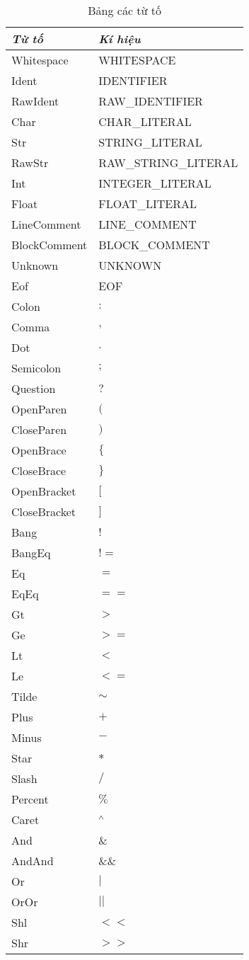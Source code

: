 \begin{longtable}{|p{4cm}| l |}
    \caption{Bảng các từ tố} \\
\hline
\textbf{\textit{Từ tố}} & \textbf{\textit{Kí hiệu}} \\
\hline
Whitespace & WHITESPACE \\
\hline
Ident & IDENTIFIER \\
\hline
RawIdent & RAW\_IDENTIFIER \\
\hline
Char & CHAR\_LITERAL \\
\hline
Str & STRING\_LITERAL \\
\hline
RawStr & RAW\_STRING\_LITERAL \\
\hline
Int & INTEGER\_LITERAL \\
\hline
Float & FLOAT\_LITERAL \\
\hline
LineComment & LINE\_COMMENT \\
\hline
BlockComment & BLOCK\_COMMENT \\
\hline
Unknown & UNKNOWN \\
\hline
Eof & EOF \\
\hline
Colon & $:$ \\
\hline
Comma & $,$ \\
\hline
Dot & $.$ \\
\hline
Semicolon & $;$ \\
\hline
Question & $?$ \\
\hline
OpenParen & $($ \\
\hline
CloseParen & $)$ \\
\hline
OpenBrace & $\{$ \\
\hline
CloseBrace & $\}$ \\
\hline
OpenBracket & $[$ \\
\hline
CloseBracket & $]$ \\
\hline
Bang & $!$ \\
\hline
BangEq & $!=$ \\
\hline
Eq & $=$ \\
\hline
EqEq & $==$ \\
\hline
Gt & $>$ \\
\hline
Ge & $>=$ \\
\hline
Lt & $<$ \\
\hline
Le & $<=$ \\
\hline
Tilde & $\sim$ \\
\hline
Plus & $+$ \\
\hline
Minus & $-$ \\
\hline
Star & $*$ \\
\hline
Slash & $/$ \\
\hline
Percent & $\%$ \\
\hline
Caret & $\textsuperscript{$\wedge$}$ \\
\hline
And & $\&$ \\
\hline
AndAnd & $\&\&$ \\
\hline
Or & $|$ \\
\hline
OrOr & $||$ \\
\hline
Shl & $<<$ \\
\hline
Shr & $>>$ \\
\hline
\end{longtable}
